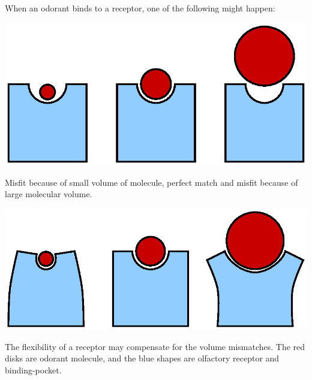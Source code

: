 \documentclass[a1paper,fontscale=0.5]{baposter} %
\begin{document}
\begin{poster}
{%
%
%

When an odorant binds to a receptor, one of the following might happen:
\begin{center}
\includegraphics[width=0.65 \textwidth]{fig/binding-pocket-size} \\
\end{center}
Misfit because of small volume of molecule, perfect match and misfit because of large molecular volume.
\begin{center}
\includegraphics[width=0.65 \textwidth]{fig/binding-pocket-flex}
\end{center}
The flexibility of a receptor may compensate for the volume mismatches. 
The red disks are odorant molecule, 
and the blue shapes are olfactory receptor and binding-pocket.

}
\end{poster}
\end{document}
